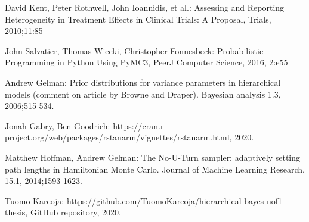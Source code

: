 \documentclass[12pt,a4paper,leqno]{report}
\theoremstyle{plain}
\theoremstyle{definition}
\theoremstyle{remark}
\begin{document}
\begin{thebibliography}{4}
    David Kent, Peter Rothwell, John Ioannidis, et al.: Assessing and Reporting Heterogeneity in
    Treatment Effects in Clinical Trials: A Proposal, Trials, 2010;11:85

    John Salvatier, Thomas Wiecki, Christopher Fonnesbeck: Probabilistic Programming in Python Using PyMC3, PeerJ Computer
    Science, 2016, 2:e55

    Andrew Gelman: Prior distributions for variance parameters in hierarchical models
    (comment on article by Browne and Draper). Bayesian analysis 1.3, 2006;515-534.

    Jonah Gabry, Ben Goodrich:
    https://cran.r-project.org/web/packages/rstanarm/vignettes/rstanarm.html, 2020.
    
    Matthew Hoffman, Andrew Gelman: The No-U-Turn sampler: adaptively setting path
    lengths in Hamiltonian Monte Carlo. Journal of Machine Learning Research. 15.1, 2014;1593-1623.

    Tuomo Kareoja: https://github.com/TuomoKareoja/hierarchical-bayes-nof1-thesis,
    GitHub repository, 2020.

\end{thebibliography}
\end{document}
